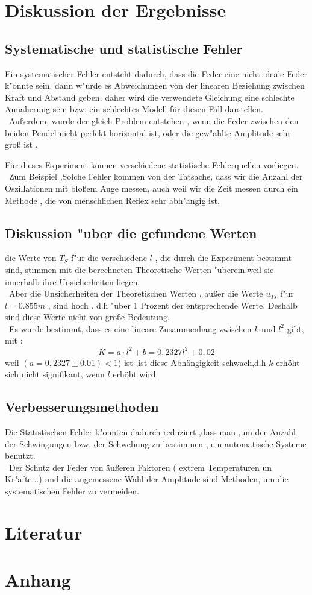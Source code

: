 \documentclass[11pt,a4paper]{article}
\begin{document}
\section{Diskussion der Ergebnisse}
\subsection{Systematische und statistische Fehler}
Ein systematischer Fehler entsteht dadurch, dass die Feder eine nicht ideale Feder k"onnte sein.
dann w"urde es Abweichungen von der linearen Beziehung zwischen Kraft und Abstand geben. daher wird die verwendete Gleichung eine schlechte Annäherung sein bzw. ein schlechtes Modell für diesen Fall darstellen.
\\\
Außerdem, wurde der gleich Problem entstehen , wenn die Feder zwischen den beiden Pendel nicht perfekt horizontal ist, oder die gew"ahlte Amplitude sehr groß ist .

Für dieses Experiment können verschiedene statistische Fehlerquellen vorliegen.
\\\
Zum Beispiel ,Solche Fehler kommen von der Tatsache, dass wir die Anzahl der Oszillationen mit bloßem Auge messen, auch weil wir die Zeit messen durch ein Methode , die von menschlichen Reflex sehr abh"angig ist.
\subsection{Diskussion "uber die gefundene Werten}
die Werte von $T_S$ f"ur die verschiedene $l$ , die durch die Experiment bestimmt sind, stimmen mit die berechneten Theoretische Werten "uberein.weil sie innerhalb ihre Unsicherheiten liegen.
\\\
Aber die Unsicherheiten der Theoretischen Werten , außer die Werte $u_{Ts}$ f"ur $l=0.855 m$ , sind hoch . d.h "uber 1 Prozent der entsprechende Werte. Deshalb sind diese Werte nicht von große Bedeutung.
\\\
Es wurde bestimmt, dass es eine lineare Zusammenhang zwischen $k$ und $l^2$ gibt, mit :
$$ K = a\cdot l^2 +b = 0,2327 l^2 + 0,02 $$
weil $(a=0,2327 \pm 0.01 ) < 1) $ ist ,ist diese Abhängigkeit schwach,d.h $k$ erhöht sich nicht signifikant, wenn $l$ erhöht wird.
\subsection{Verbesserungsmethoden}
Die Statistischen Fehler k"onnten dadurch reduziert ,dass man  ,um der Anzahl der Schwingungen bzw. der Schwebung zu bestimmen , ein automatische Systeme benutzt.
\\\
Der Schutz der Feder von äußeren Faktoren ( extrem Temperaturen un Kr"afte...) und die angemessene Wahl der Amplitude sind Methoden, um die systematischen Fehler zu vermeiden.
\section{Literatur}

\section{Anhang}
\end{document}
